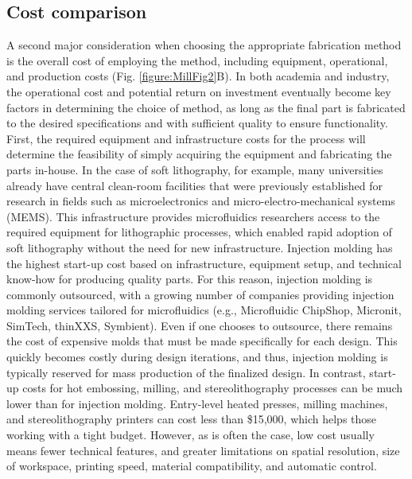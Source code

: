 \subsection{Cost comparison}
A second major consideration when choosing the appropriate fabrication method is the overall cost of employing the method, including equipment, operational, and production costs (Fig. \ref{figure:MillFig2}B). In both academia and industry, the operational cost and potential return on investment eventually become key factors in determining the choice of method, as long as the final part is fabricated to the desired specifications and with sufficient quality to ensure functionality.
First, the required equipment and infrastructure costs for the process will determine the feasibility of simply acquiring the equipment and fabricating the parts in-house. In the case of soft lithography, for example, many universities already have central clean-room facilities that were previously established for research in fields such as microelectronics and micro-electro-mechanical systems (MEMS). This infrastructure provides microfluidics researchers access to the required equipment for lithographic processes, which enabled rapid adoption of soft lithography without the need for new infrastructure.
Injection molding has the highest start-up cost based on infrastructure, equipment setup, and technical know-how for producing quality parts. For this reason, injection molding is commonly outsourced, with a growing number of companies providing injection molding services tailored for microfluidics (e.g., Microfluidic ChipShop, Micronit, SimTech, thinXXS, Symbient). Even if one chooses to outsource, there remains the cost of expensive molds that must be made specifically for each design. This quickly becomes costly during design iterations, and thus, injection molding is typically reserved for mass production of the finalized design. In contrast, start-up costs for hot embossing, milling, and stereolithography processes can be much lower than for injection molding. Entry-level heated presses, milling machines, and stereolithography printers can cost less than \$15,000, which helps those working with a tight budget. However, as is often the case, low cost usually means fewer technical features, and greater limitations on spatial resolution, size of workspace, printing speed, material compatibility, and automatic control. 
